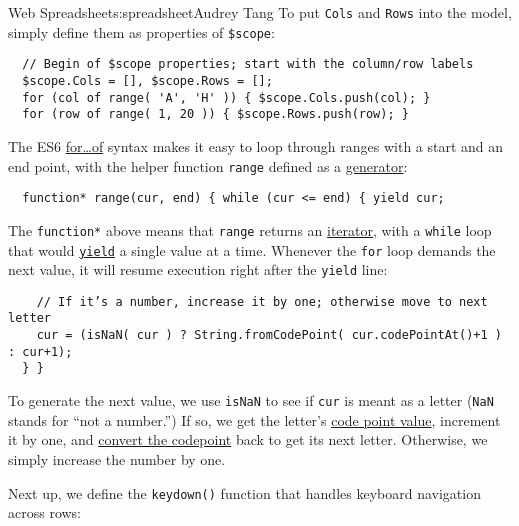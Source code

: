 \begin{aosachapter}{Web Spreadsheet}{s:spreadsheet}{Audrey Tang}
To put \texttt{Cols} and \texttt{Rows} into the model, simply define
them as properties of \texttt{\$scope}:

\begin{verbatim}
  // Begin of $scope properties; start with the column/row labels
  $scope.Cols = [], $scope.Rows = [];
  for (col of range( 'A', 'H' )) { $scope.Cols.push(col); }
  for (row of range( 1, 20 )) { $scope.Rows.push(row); }
\end{verbatim}

The ES6
\href{https://developer.mozilla.org/en-US/docs/Web/JavaScript/Reference/Statements/for...of}{for\ldots{}of}
syntax makes it easy to loop through ranges with a start and an end
point, with the helper function \texttt{range} defined as a
\href{https://developer.mozilla.org/en-US/docs/Web/JavaScript/Reference/Statements/function*}{generator}:

\begin{verbatim}
  function* range(cur, end) { while (cur <= end) { yield cur;
\end{verbatim}

The \texttt{function*} above means that \texttt{range} returns an
\href{https://developer.mozilla.org/en-US/docs/Web/JavaScript/Guide/The_Iterator_protocol}{iterator},
with a \texttt{while} loop that would
\href{https://developer.mozilla.org/en-US/docs/Web/JavaScript/Reference/Operators/yield}{\texttt{yield}}
a single value at a time. Whenever the \texttt{for} loop demands the
next value, it will resume execution right after the \texttt{yield}
line:

\begin{verbatim}
    // If it’s a number, increase it by one; otherwise move to next letter
    cur = (isNaN( cur ) ? String.fromCodePoint( cur.codePointAt()+1 ) : cur+1);
  } }
\end{verbatim}

To generate the next value, we use \texttt{isNaN} to see if \texttt{cur}
is meant as a letter (\texttt{NaN} stands for ``not a number.'') If so,
we get the letter's
\href{https://developer.mozilla.org/en-US/docs/Web/JavaScript/Reference/Global_Objects/String/codePointAt}{code
point value}, increment it by one, and
\href{https://developer.mozilla.org/en-US/docs/Web/JavaScript/Reference/Global_Objects/String/fromCodePoint}{convert
the codepoint} back to get its next letter. Otherwise, we simply
increase the number by one.

Next up, we define the \texttt{keydown()} function that handles keyboard
navigation across rows:


\end{aosachapter}
